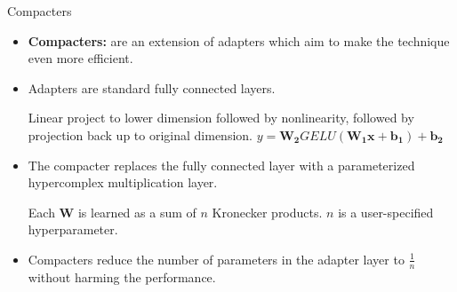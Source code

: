 \documentclass[serif, aspectratio=169]{beamer}
\begin{document}
\begin{frame}{Compacters}
            \begin{itemize}
                \item  
                    \textbf{Compacters: }
                     are an extension of adapters which aim to make the technique even more efficient.
                    \vspace{0.1cm}
                \item  
                     Adapters are standard fully connected layers.
                     \vspace{0.2cm}
                    \begin{outline}
                        \1 Linear project to lower dimension followed by nonlinearity, followed by projection back up to original dimension.
                        \vspace{0.1cm}
                        \1 \(y = \boldsymbol{W_2} GELU(\boldsymbol{W_1x} + \boldsymbol{b_1}) + \boldsymbol{b_2}\)
                    \end{outline}
                    \vspace{0.1cm}
                \item  
                     The compacter replaces the fully connected layer with a parameterized hypercomplex multiplication layer.
                     \vspace{0.2cm}
                    \begin{outline}
                        \1Each $\boldsymbol{W}$ is learned as a sum of $n$ Kronecker products.
                        \vspace{0.1cm}
                        \1 $n$ is a user-specified hyperparameter.
                    \end{outline}
                    \vspace{0.1cm}
                \item 
                    Compacters reduce the number of parameters in the adapter layer to $\frac{1}{n}$ without harming the performance.
            \end{itemize}
\end{frame}
\end{document}
